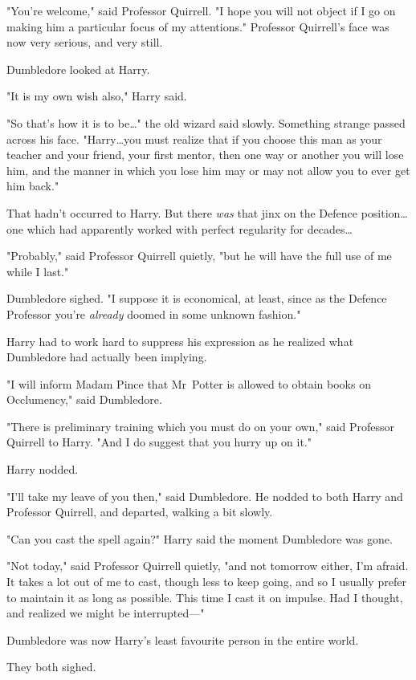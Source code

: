 "You're welcome," said Professor Quirrell. "I hope you will not object if I go
on making him a particular focus of my attentions." Professor Quirrell's face
was now very serious, and very still.

Dumbledore looked at Harry.

"It is my own wish also," Harry said.

"So that's how it is to be…" the old wizard said slowly. Something
strange passed across his face. "Harry…you must realize that if you
choose this man as your teacher and your friend, your first mentor, then one
way or another you will lose him, and the manner in which you lose him may or
may not allow you to ever get him back."

That hadn't occurred to Harry. But there \emph{was} that jinx on the Defence
position…one which had apparently worked with perfect regularity for
decades…

"Probably," said Professor Quirrell quietly, "but he will have the full use of
me while I last."

Dumbledore sighed. "I suppose it is economical, at least, since as the Defence
Professor you're \emph{already} doomed in some unknown fashion."

Harry had to work hard to suppress his expression as he realized what
Dumbledore had actually been implying.

"I will inform Madam Pince that Mr~Potter is allowed to obtain books on
Occlumency," said Dumbledore.

"There is preliminary training which you must do on your own," said Professor
Quirrell to Harry. "And I do suggest that you hurry up on it."

Harry nodded.

"I'll take my leave of you then," said Dumbledore. He nodded to both Harry and
Professor Quirrell, and departed, walking a bit slowly.

"Can you cast the spell again?" Harry said the moment Dumbledore was gone.

"Not today," said Professor Quirrell quietly, "and not tomorrow either, I'm
afraid. It takes a lot out of me to cast, though less to keep going, and so I
usually prefer to maintain it as long as possible. This time I cast it on
impulse. Had I thought, and realized we might be interrupted---"

Dumbledore was now Harry's least favourite person in the entire world.

They both sighed.

